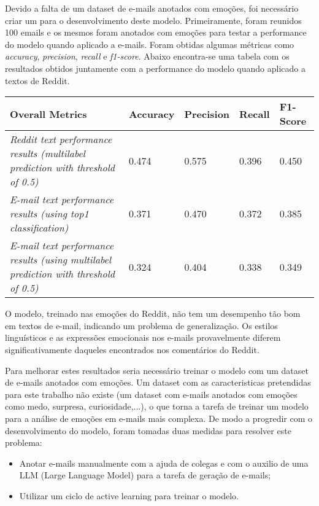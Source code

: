 Devido a falta de um dataset de e-mails anotados com emoções, foi necessário criar um para o desenvolvimento deste modelo. 
Primeiramente, foram reunidos 100 emails e os mesmos foram anotados com emoções para testar a performance do modelo quando aplicado a e-mails. Foram obtidas algumas métricas como \textit{accuracy}, \textit{precision}, \textit{recall} e \textit{f1-score}. Abaixo encontra-se uma tabela com os resultados obtidos juntamente com a performance do modelo quando aplicado a textos de Reddit.

\begin{table}[ht]
    \centering
    \begin{tabular}{p{7cm}p{1.5cm}p{1.5cm}p{1.5cm}p{1cm}}
    \hline
    \textbf{Overall Metrics} & \textbf{Accuracy} & \textbf{Precision} & \textbf{Recall} & \textbf{F1-Score} \\
    \hline
    \textit{Reddit text performance results (multilabel prediction with threshold of 0.5)} & 0.474 & 0.575 & 0.396 & 0.450 \\
    \hline
    \textit{E-mail text performance results (using top1 classification)} & 0.371 & 0.470 & 0.372 & 0.385 \\
    \hline
    \hline
    \textit{E-mail text performance results (using multilabel prediction with threshold of 0.5)} & 0.324 & 0.404 & 0.338 & 0.349 \\
    \hline
    \end{tabular}
    \label{tbl:c4:results_table}
    \end{table}

O modelo, treinado nas emoções do Reddit, não tem um desempenho tão bom em textos de e-mail, indicando um problema de generalização. Os estilos linguísticos e as expressões emocionais nos e-mails provavelmente diferem significativamente daqueles encontrados nos comentários do Reddit.

Para melhorar estes resultados seria necessário treinar o modelo com um dataset de e-mails anotados com emoções. Um dataset com as caracteristicas pretendidas para este trabalho não existe (um dataset com e-mails anotados com emoções como medo, surpresa, curiosidade,...), o que torna a tarefa de treinar um modelo para a análise de emoções em e-mails mais complexa. De modo a progredir com o desenvolvimento do modelo, foram tomadas duas medidas para resolver este problema:
\begin{itemize}
    \item Anotar e-mails manualmente com a ajuda de colegas e com o auxilio de uma LLM (Large Language Model) para a tarefa de geração de e-mails;
    \item Utilizar um ciclo de active learning para treinar o modelo.
\end{itemize}

